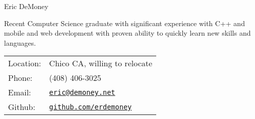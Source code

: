 \documentclass[letterpaper]{article}
\def\name{Eric DeMoney}
\begin{document}
{\huge \name}



\begin{minipage}{0.475\linewidth}
   Recent Computer Science graduate with significant experience with C++ and mobile and web development with proven ability to quickly learn new skills and languages. 
\end{minipage}
\hspace{0.125cm}
\begin{minipage}{0.475\linewidth}
  \begin{tabular}{ll}
    Location: & Chico CA, willing to relocate\\
    Phone: & (408) 406-3025\\
    Email: & \href{mailto:eric@demoney.net}{\tt eric@demoney.net}\\
    Github: & \href{https://github.com/erdemoney}{\tt github.com/erdemoney}\\
  \end{tabular}
\end{minipage}

\vspace{0.2in}
\end{document}
